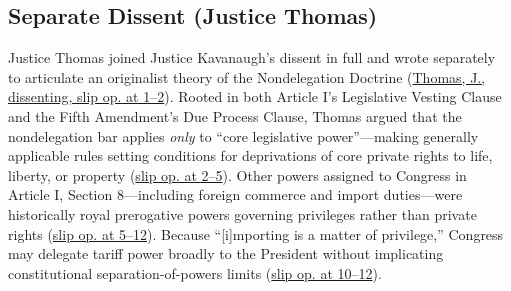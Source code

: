 \documentclass[12pt]{article}
\begin{document}
\subsection{Separate Dissent (Justice Thomas)}
Justice Thomas joined Justice Kavanaugh's dissent in full and wrote separately to articulate an originalist theory of the Nondelegation Doctrine (\href{https://www.law.cornell.edu/supremecourt/text/24-1287}{Thomas, J., dissenting, slip op. at 1--2}). Rooted in both Article I's Legislative Vesting Clause and the Fifth Amendment's Due Process Clause, Thomas argued that the nondelegation bar applies \textit{only} to ``core legislative power''---making generally applicable rules setting conditions for deprivations of core private rights to life, liberty, or property (\href{https://www.law.cornell.edu/supremecourt/text/24-1287}{slip op. at 2--5}). Other powers assigned to Congress in Article I, Section 8---including foreign commerce and import duties---were historically royal prerogative powers governing privileges rather than private rights (\href{https://www.law.cornell.edu/supremecourt/text/24-1287}{slip op. at 5--12}). Because ``[i]mporting is a matter of privilege,'' Congress may delegate tariff power broadly to the President without implicating constitutional separation-of-powers limits (\href{https://www.law.cornell.edu/supremecourt/text/24-1287}{slip op. at 10--12}).
\end{document}
